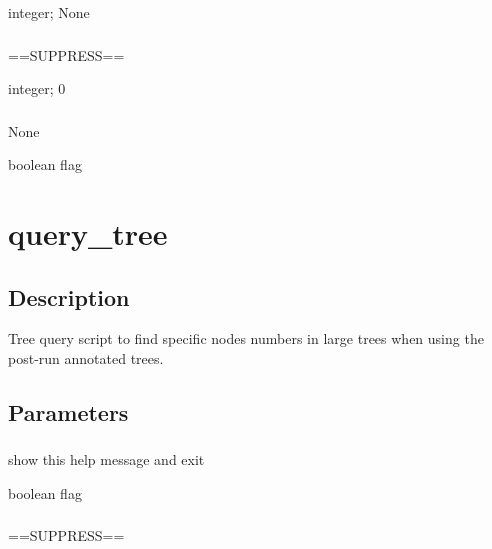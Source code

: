 \documentclass[letterpaper,12pt,english]{sphinxmanual}
\begin{document}
 integer;  None


\subsubsection{}
\label{\detokenize{prog_desc:s-startk}}
 ==SUPPRESS==

 integer;  0


\subsubsection{}
\label{\detokenize{prog_desc:id6}}
 None

 boolean flag


\section{query\_tree}
\label{\detokenize{prog_desc:query-tree}}

\subsection{Description}
\label{\detokenize{prog_desc:id7}}
Tree query script to find specific nodes numbers in large trees
when using the post-run annotated trees.



\subsection{Parameters}
\label{\detokenize{prog_desc:id8}}

\subsubsection{}
\label{\detokenize{prog_desc:id9}}
 show this help message and exit

 boolean flag


\subsubsection{}
\label{\detokenize{prog_desc:id10}}
 ==SUPPRESS==
\end{document}
